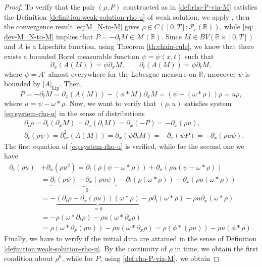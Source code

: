 \documentclass[11pt,a4paper,oneside]{amsart}
\newcommand\R{\mathbb{R}}
\newcommand{\MM}{\mathcal{M}}
\newcommand{\PP}{\mathcal{P}}
\newcommand{\Lip}{\text{Lip}}
\begin{document}
\begin{proof}
To verify that the \textcolor{black}{pair} $(\rho,P)$ constructed as in \eqref{def:rho-P-via-M} satisfies the Definition \ref{definition:weak-solution-rho-u} 
of weak solution, we apply \cite[Lemma 2.1]{Brenier-Grenier}, then the convergence result \eqref{eq:M_N-to-M} gives $\rho\in C([0,T];\PP_c(\R))$, 
while \eqref{eq: dev-M_N-to-M} implies that $P=-\partial_t M\in \MM(\R)$. Since $M\in BV(\R\times[0,T])$ and $A$ is a Lipschitz function, 
using Theorem \ref{th:chain-rule}, we know that there exists a bounded Borel measurable function $\psi=\psi(x,t)$ such that
    $$
    \partial_x(A(M))=\psi\partial_x M,\qquad \partial_t(A(M))=\psi\partial_t M,
    $$
where $\psi=A'$ almost everywhere for the Lebesgue measure on $\R$, moreover $\psi$ is bounded by $|A|_{\Lip}$. Then,
    $$
    P=-\partial_t M=\partial_x(A(M))-(\phi\ast M)\partial_x M=(\psi-(\omega\ast \rho))\rho=u\rho,
    $$
    where $u=\psi-\omega\ast\rho$. Now, we want to verify that $(\rho,u)$ satisfies system \eqref{eq:system-rho-u} in the sense of distributions
    \begin{align*}
        &\partial_t\rho=\partial_t(\partial_x M)=\partial_x(\partial_t M)=\partial_x(-P)=-\partial_x(\rho u),\\
        & \partial_t(\rho\psi)=\partial^2_{tx}(A(M))=\partial_x(\psi\partial_t M)=-\partial_x(\psi P)=-\partial_x(\rho u \psi).
    \end{align*}
    The first equation of \eqref{eq:system-rho-u} is verified, while for the second one we have
    \begin{align*}
        \partial_t(\rho u) & +\partial_x(\rho u^2)= \partial_t(\rho(\psi-\omega\ast\rho))+\partial_x(\rho u(\psi-\omega\ast\rho))\\
        & = \underbrace{\partial_t(\rho \psi)+\partial_x(\rho u\psi)}_{=0} -\partial_t(\rho(\omega\ast\rho))-\partial_x(\rho u(\omega\ast\rho))\\
        & = -\underbrace{(\partial_t\rho+\partial_x(\rho u))(\omega\ast\rho)}_{=0}-\rho\partial_t(\omega\ast\rho)-\rho u \partial_x(\omega\ast\rho)\\
        & = -\rho(\omega\ast\partial_t\rho)-\rho u(\omega\ast\partial_x\rho)\\
        & = \rho(\omega\ast\partial_x(\rho u))-\rho u (\omega\ast\partial_x\rho)=\rho(\phi\ast(\rho u))-\rho u (\phi\ast\rho).
    \end{align*}
    Finally, we have to verify if the initial data are attained in the sense of Definition \ref{definition:weak-solution-rho-u}. 
    By the continuity of $\rho$ in time, we obtain the first condition about $\rho^0$, while for $P$, using \eqref{def:rho-P-via-M}, we obtain

\end{proof}
\end{document}
